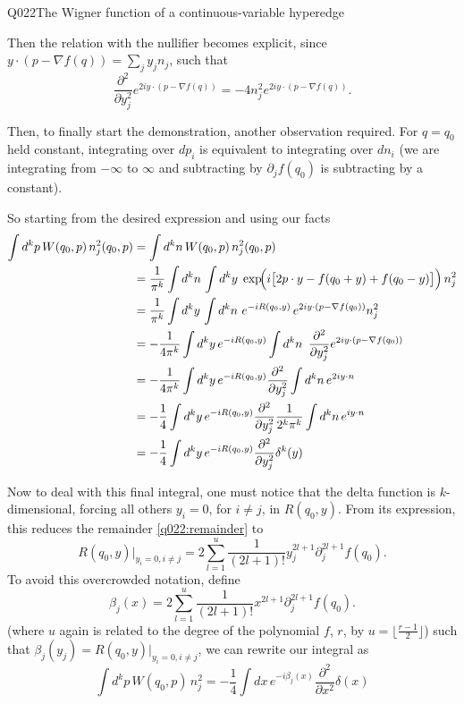 \begin{entry}{Q022}{The Wigner function of a continuous-variable hyperedge}
\begin{solution}[Part (d)]
Then the relation with the nullifier becomes explicit, since $y\cdot(p-\nabla f(q))= \sum_j y_j n_j$, such that
\[
  \frac{\partial^2}{\partial y_j^2} e^{2iy\cdot(p-\nabla f(q))}= -4n_j^2 e^{2iy\cdot(p-\nabla f(q))}.
\]

Then, to finally start the demonstration, another observation required. For $q=q_0$ held constant, integrating over $dp_i$ is equivalent to integrating over $dn_i$ (we are integrating from $-\infty$ to $\infty$ and subtracting by $\partial_jf(q_0)$ is subtracting by a constant).

So starting from the desired expression and using our facts
\begin{equation}
\begin{split}
    \int d^{k}p\,W(q_0,p)\,n_j^{2}(q_0,p)&= \int d^{k}n\,W(q_0,p)\,n_j^{2}(q_0,p) \\
    &= \frac{1}{\pi^{k}}\int d^{k}n\, \int d^{k}y\;
          \exp\!\Bigl(i\bigl[2p\cdot y-f(q_0+y)+f(q_0-y)\bigr]\Bigr)\,n_j^{2}\\
    &= \frac{1}{\pi^{k}} \int d^{k}y\, \int d^{k}n\
          e^{-iR(q_0,y)}\, e^{2iy\cdot(p-\nabla f(q_0))} n_j^{2} \\
    &= -\frac{1}{4\pi^{k}} \int d^{k}y\, e^{-iR(q_0,y)} \int d^{k}n\
          \, \frac{\partial^2}{\partial y_j^2}e^{2iy\cdot(p-\nabla f(q_0))} \\
    &=- \frac{1}{4\pi^{k}} \int d^{k}y\, e^{-iR(q_0,y)}\frac{\partial^2}{\partial y_j^2} \int d^{k}n \, e^{2iy\cdot n}\\
    &= - \frac{1}{4} \int d^{k}y\, e^{-iR(q_0,y)}\frac{\partial^2}{\partial y_j^2} \frac{1}{2^k \pi^k} \int d^{k}n \, e^{iy\cdot n}\\
    &=- \frac{1}{4} \int d^{k}y\, e^{-iR(q_0,y)}\frac{\partial^2}{\partial y_j^2} \delta^{k}(y)
\end{split}
\label{q022:moment-delta}
\end{equation}

Now to deal with this final integral, one must notice that the delta function is $k$-dimensional, forcing all others $y_i=0$, for $i\neq j$, in $R(q_0,y)$. From its expression, this reduces the remainder \eqref{q022:remainder} to
\begin{equation}
     R(q_0, y)|_{y_i=0,i\neq j} =  2\sum_{l=1}^{u} \frac{1}{(2l+1)!} y_j^{2l+1} \partial_j^{2l+1}f(q_0).
\end{equation}
To avoid this overcrowded notation, define
\begin{equation}
    \beta_j(x) = 2\sum_{l=1}^{u} \frac{1}{(2l+1)!} x^{2l+1} \partial_j^{2l+1}f(q_0).
    \label{q022:beta}
\end{equation}
(where $u$ again is related to the degree of the polynomial $f$, $r$, by $u =\lfloor \frac{r-1}{2}\rfloor$) such that $\beta_j(y_j)=R(q_0, y)|_{y_i=0,i\neq j}$, we can rewrite our integral as
\begin{equation}
    \int d^{k}p\,W(q_0,p)\,n_j^{2}= - \frac{1}{4} \int dx\, e^{-i\beta_j(x)}\frac{\partial^2}{\partial x^2} \delta(x)
\end{equation}


\end{solution}
\end{entry}
